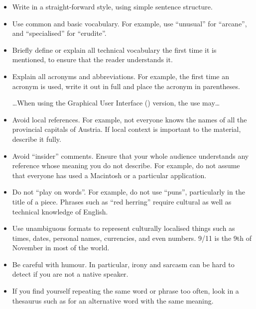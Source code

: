 \begin{itemize}
\item Write in a straight-forward style, using simple sentence
  structure.

\item Use common and basic vocabulary. For example, use \enquote{unusual}
  for \enquote{arcane}, and \enquote{specialised} for \enquote{erudite}.

\item Briefly define or explain all technical vocabulary the first
  time it is mentioned, to ensure that the reader understands it.

\item Explain all acronyms and abbreviations. For example, the first
  time an acronym is used, write it out in full and place the acronym
  in parentheses.

{\ldots When using the Graphical User Interface () version, the use may\ldots}


\item Avoid local references. For example, not everyone knows the
  names of all the provincial capitals of Austria. If local context is
  important to the material, describe it fully.

\item Avoid \enquote{insider} comments. Ensure that your whole audience
  understands any reference whose meaning you do not describe. For
  example, do not assume that everyone has used a Macintosh or a
  particular application.

\item Do not \enquote{play on words}. For example, do not use \enquote{puns},
  particularly in the title of a piece. Phrases such as ``red
  herring'' require cultural as well as technical knowledge of
  English.

\item Use unambiguous formats to represent culturally localised things
  such as times, dates, personal names, currencies, and even
  numbers. 9/11 is the 9th of November in most of the world.

\item Be careful with humour. In particular, irony and sarcasm can be
  hard to detect if you are not a native speaker.

\item If you find yourself repeating the same word or phrase too often,
  look in a thesaurus such as \textcite{Roget,RogetII} for an
  alternative word with the same meaning.
\end{itemize}


